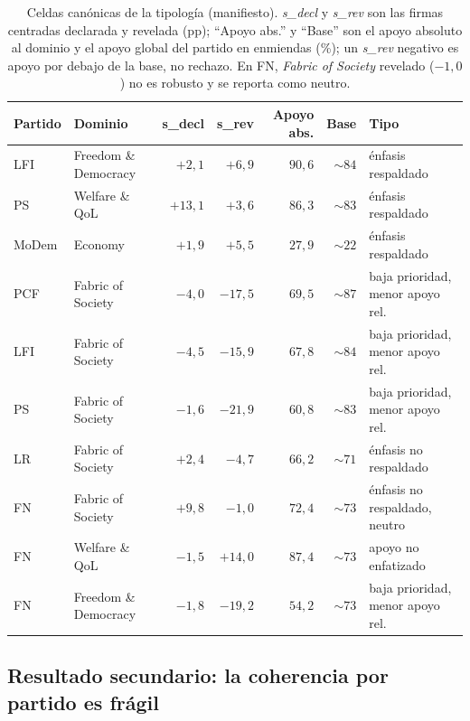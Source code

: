 \begin{table}[H]
\centering
\caption{Celdas canónicas de la tipología (manifiesto). \emph{s\_decl} y
\emph{s\_rev} son las firmas centradas declarada y revelada (pp); ``Apoyo abs.'' y
``Base'' son el apoyo absoluto al dominio y el apoyo global del partido en
enmiendas (\%); un \emph{s\_rev} negativo es apoyo por debajo de la base, no
rechazo. En FN, \emph{Fabric of Society} revelado ($-1{,}0$) no es robusto y se
reporta como neutro.}
\label{tab:cruce-casos}
\small
\begin{tabularx}{\textwidth}{@{}l >{\raggedright\arraybackslash}X r r r r >{\raggedright\arraybackslash}X@{}}
\toprule
\textbf{Partido} & \textbf{Dominio} & \textbf{s\_decl} & \textbf{s\_rev} & \textbf{Apoyo abs.} & \textbf{Base} & \textbf{Tipo} \\
\midrule
LFI & Freedom \& Democracy & $+2{,}1$ & $+6{,}9$ & $90{,}6$ & $\sim 84$ & énfasis respaldado \\
PS & Welfare \& QoL & $+13{,}1$ & $+3{,}6$ & $86{,}3$ & $\sim 83$ & énfasis respaldado \\
MoDem & Economy & $+1{,}9$ & $+5{,}5$ & $27{,}9$ & $\sim 22$ & énfasis respaldado \\
PCF & Fabric of Society & $-4{,}0$ & $-17{,}5$ & $69{,}5$ & $\sim 87$ & baja prioridad, menor apoyo rel. \\
LFI & Fabric of Society & $-4{,}5$ & $-15{,}9$ & $67{,}8$ & $\sim 84$ & baja prioridad, menor apoyo rel. \\
PS & Fabric of Society & $-1{,}6$ & $-21{,}9$ & $60{,}8$ & $\sim 83$ & baja prioridad, menor apoyo rel. \\
LR & Fabric of Society & $+2{,}4$ & $-4{,}7$ & $66{,}2$ & $\sim 71$ & énfasis no respaldado \\
FN & Fabric of Society & $+9{,}8$ & $-1{,}0$ & $72{,}4$ & $\sim 73$ & énfasis no respaldado, neutro \\
FN & Welfare \& QoL & $-1{,}5$ & $+14{,}0$ & $87{,}4$ & $\sim 73$ & apoyo no enfatizado \\
FN & Freedom \& Democracy & $-1{,}8$ & $-19{,}2$ & $54{,}2$ & $\sim 73$ & baja prioridad, menor apoyo rel. \\
\bottomrule
\end{tabularx}
\end{table}

\subsection{Resultado secundario: la coherencia por partido es frágil}
\label{sec:res-cruce-coherencia}


